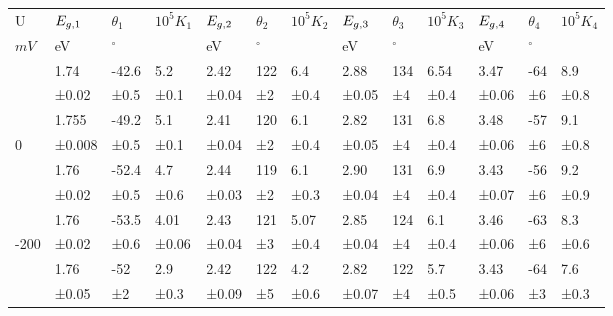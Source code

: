 \begin{refsection}
    \begin{table}[H] 
        \centering
        \begin{footnotesize}
        \begin{tabular}{l|lll|lll|lll|lll}
            \toprule
            U & $E_{g,1}$ & $\theta_1$ & $10^{5}K_1$ & $E_{g,2}$ & $\theta_2$ & $10^{5}K_2$ & $E_{g,3}$ & $\theta_3$ &
            $10^{5}K_3$ & $E_{g,4}$ & $\theta_4$ & $10^{5}K_4$\\
            $mV$ & eV & $^{\circ}$ &  & eV & $^{\circ}$ &  & eV & $^{\circ}$ &  & eV & $^{\circ}$ & \\
            \midrule
            \rowcolor{lightgray} & 1.74 & -42.6 & 5.2 & 2.42 & 122 & 6.4 & 2.88 & 134 & 6.54 & 3.47 & -64 & 8.9\\
            \rowcolor{lightgray}\multirow{-2}{*}{100} & ±0.02 & ±0.5 & ±0.1 & ±0.04 & ±2 & ±0.4 & ±0.05 & ±4 & ±0.4 & ±0.06 & ±6 & ±0.8\\ \hline

             & 1.755 & -49.2 & 5.1 & 2.41 & 120 & 6.1 & 2.82 & 131 & 6.8 & 3.48 & -57 & 9.1\\ 
             \multirow{-2}{*}{0} & ±0.008 & ±0.5 & ±0.1 & ±0.04 & ±2 & ±0.4 & ±0.05 & ±4 & ±0.4 & ±0.06 & ±6 & ±0.8\\ \hline

             \rowcolor{lightgray} & 1.76 &  -52.4 & 4.7 & 2.44 & 119 & 6.1 & 2.90 & 131 & 6.9 & 3.43 &  -56 & 9.2 \\
             \rowcolor{lightgray}\multirow{-2}{*}{-100} & ±0.02 &  ±0.5 & ±0.6 & ±0.03 & ±2 & ±0.3 & ±0.04 & ±4 & ±0.4 & ±0.07 &  ±6 & ±0.9 \\ \hline

             & 1.76 &  -53.5 & 4.01 & 2.43 & 121 & 5.07 & 2.85 & 124 & 6.1 & 3.46 &  -63 & 8.3 \\
             \multirow{-2}{*}{-200} & ±0.02 &  ±0.6 & ±0.06 & ±0.04 & ±3 & ±0.4 & ±0.04 & ±4 & ±0.4 & ±0.06 &  ±6 & ±0.6 \\ \hline
                
             \rowcolor{lightgray} & 1.76 &  -52 & 2.9 & 2.42 & 122 & 4.2 & 2.82 & 122 & 5.7 & 3.43 &  -64 & 7.6 \\
             \rowcolor{lightgray}\multirow{-2}{*}{-300} & ±0.05 &  ±2 & ±0.3 & ±0.09 & ±5 & ±0.6 & ±0.07 & ±4 & ±0.5 & ±0.06 &  ±3 & ±0.3 \\ \hline


\end{tabular}
\end{footnotesize}
\end{table}
\end{refsection}
